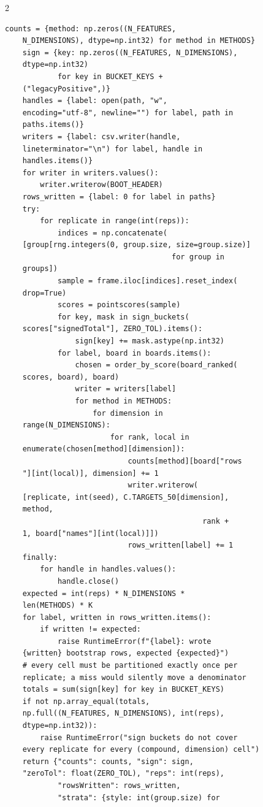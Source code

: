 \begin{multicols}{2}
\begin{Verbatim}[fontsize=\scriptsize]
    counts = {method: np.zeros((N_FEATURES,
    N_DIMENSIONS), dtype=np.int32) for method in METHODS}
    sign = {key: np.zeros((N_FEATURES, N_DIMENSIONS),
    dtype=np.int32)
            for key in BUCKET_KEYS +
    ("legacyPositive",)}
    handles = {label: open(path, "w",
    encoding="utf-8", newline="") for label, path in
    paths.items()}
    writers = {label: csv.writer(handle,
    lineterminator="\n") for label, handle in
    handles.items()}
    for writer in writers.values():
        writer.writerow(BOOT_HEADER)
    rows_written = {label: 0 for label in paths}
    try:
        for replicate in range(int(reps)):
            indices = np.concatenate(
    [group[rng.integers(0, group.size, size=group.size)]
                                      for group in
    groups])
            sample = frame.iloc[indices].reset_index(
    drop=True)
            scores = pointscores(sample)
            for key, mask in sign_buckets(
    scores["signedTotal"], ZERO_TOL).items():
                sign[key] += mask.astype(np.int32)
            for label, board in boards.items():
                chosen = order_by_score(board_ranked(
    scores, board), board)
                writer = writers[label]
                for method in METHODS:
                    for dimension in
    range(N_DIMENSIONS):
                        for rank, local in
    enumerate(chosen[method][dimension]):
                            counts[method][board["rows
    "][int(local)], dimension] += 1
                            writer.writerow(
    [replicate, int(seed), C.TARGETS_50[dimension],
    method,
                                             rank +
    1, board["names"][int(local)]])
                            rows_written[label] += 1
    finally:
        for handle in handles.values():
            handle.close()
    expected = int(reps) * N_DIMENSIONS *
    len(METHODS) * K
    for label, written in rows_written.items():
        if written != expected:
            raise RuntimeError(f"{label}: wrote
    {written} bootstrap rows, expected {expected}")
    # every cell must be partitioned exactly once per
    replicate; a miss would silently move a denominator
    totals = sum(sign[key] for key in BUCKET_KEYS)
    if not np.array_equal(totals,
    np.full((N_FEATURES, N_DIMENSIONS), int(reps),
    dtype=np.int32)):
        raise RuntimeError("sign buckets do not cover
    every replicate for every (compound, dimension) cell")
    return {"counts": counts, "sign": sign,
    "zeroTol": float(ZERO_TOL), "reps": int(reps),
            "rowsWritten": rows_written,
            "strata": {style: int(group.size) for

\end{Verbatim}
\end{multicols}
